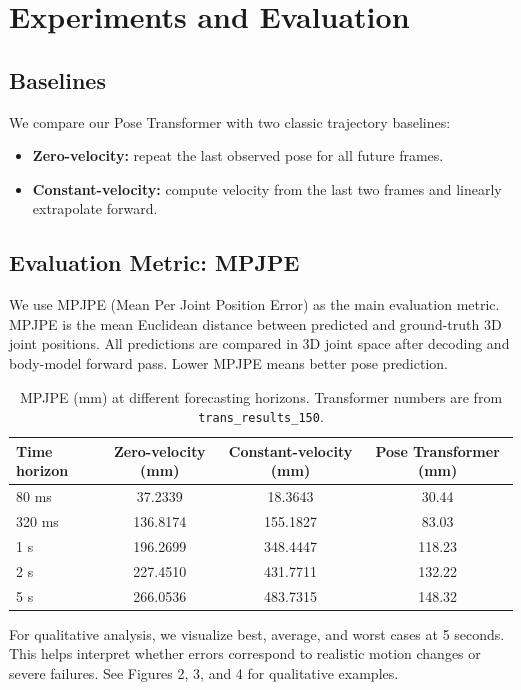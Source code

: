 \documentclass[10pt,twocolumn]{article}
\begin{document}
\section{Experiments and Evaluation}
\subsection{Baselines}
We compare our Pose Transformer with two classic trajectory baselines:
\begin{itemize}[noitemsep,topsep=2pt]
  \item \textbf{Zero-velocity:} repeat the last observed pose for all future frames.
  \item \textbf{Constant-velocity:} compute velocity from the last two frames and linearly extrapolate forward.
\end{itemize}

\subsection{Evaluation Metric: MPJPE}
We use MPJPE (Mean Per Joint Position Error) as the main evaluation metric.
MPJPE is the mean Euclidean distance between predicted and ground-truth 3D joint positions.
All predictions are compared in 3D joint space after decoding and body-model forward pass.
Lower MPJPE means better pose prediction.


\begin{table}[t]
\centering
\begin{tabular}{lccc}
\toprule
Time horizon & Zero-velocity (mm) & Constant-velocity (mm) & Pose Transformer (mm) \\
\midrule
80 ms  & 37.2339 & 18.3643 & 30.44 \\
320 ms & 136.8174 & 155.1827 & 83.03 \\
1 s    & 196.2699 & 348.4447 & 118.23 \\
2 s    & 227.4510 & 431.7711 & 132.22 \\
5 s    & 266.0536 & 483.7315 & 148.32 \\
\bottomrule
\end{tabular}
\caption{MPJPE (mm) at different forecasting horizons. Transformer numbers are from \texttt{trans\_results\_150}.}
\label{tab:mpjpe}
\end{table}

For qualitative analysis, we visualize best, average, and worst cases at 5 seconds.
This helps interpret whether errors correspond to realistic motion changes or severe failures.
See Figures 2, 3, and 4 for qualitative examples.
\end{document}
